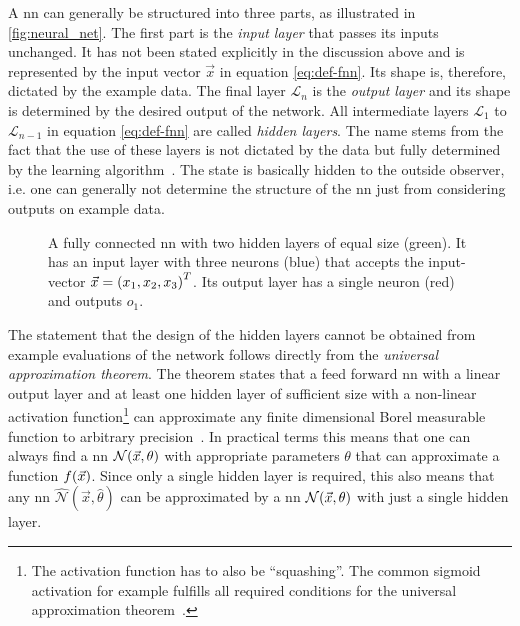 A \acrshort{nn} can generally be structured into three parts, as illustrated in \autoref{fig:neural_net}. The first part is the \emph{input layer} that passes its inputs unchanged. It has not been stated explicitly in the discussion above and is represented by the input vector $\vec{x}$ in equation \eqref{eq:def-fnn}. Its shape is, therefore, dictated by the example data. The final layer $\mathcal{L}_n$ is the \emph{output layer} and its shape is determined by the desired output of the network. All intermediate layers $\mathcal{L}_1$ to $\mathcal{L}_{n-1}$ in equation \eqref{eq:def-fnn} are called \emph{hidden layers}. The name stems from the fact that the use of these layers is not dictated by the data but fully determined by the learning algorithm~\cite{Goodfellow:2016:DNN}. The state is basically hidden to the outside observer, i.e. one can generally not determine the structure of the \acrshort{nn} just from considering outputs on example data. 

\begin{figure}
	\centering
	
	\caption[Neural network]{A  fully connected \acrshort{nn} with two hidden layers of equal size (green). It has an input layer with three neurons (blue) that accepts the input-vector $\vec{x}={\left( x_1, x_2, x_3 \right)}^T$. Its output layer has a single neuron (red) and outputs $o_1$.}\label{fig:neural_net}
\end{figure}

The statement that the design of the hidden layers cannot be obtained from example evaluations of the network follows directly from the \emph{universal approximation theorem}. The theorem states that a feed forward \acrshort{nn} with a linear output layer and at least one hidden layer of sufficient size with a non-linear activation function\footnote{The activation function has to also be \enquote{squashing}. The common sigmoid activation for example fulfills all required conditions for the universal approximation theorem~\cite{Goodfellow:2016:DNN}.} can approximate any finite dimensional Borel measurable function to arbitrary precision~\cite{Goodfellow:2016:DNN, Hornik:1989aaa, Hornik:1990aaa}. In practical terms this means that one can always find a \acrshort{nn} $\mathcal{N}{\left( \vec{x},\theta \right)}$ with appropriate parameters $\theta$ that can approximate a function $f{\left( \vec{x} \right)}$. Since only a single hidden layer is required, this also means that any \acrshort{nn} $\widehat{\mathcal{N}}(\vec{x},\hat{\theta})$ can be approximated by a \acrshort{nn} $\mathcal{N}{\left( \vec{x},\theta \right)}$ with just a single hidden layer.

